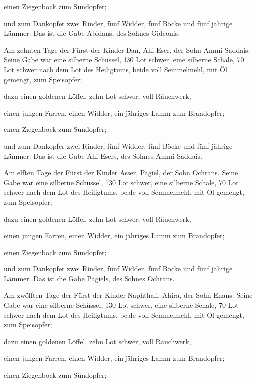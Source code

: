  einen Ziegenbock zum Sündopfer;

 und zum Dankopfer zwei Rinder, fünf Widder, fünf Böcke
und fünf jährige Lämmer. Das ist die Gabe Abidans, des Sohnes Gideonis.

 Am zehnten Tage der Fürst der Kinder Dan, Ahi-Eser, der
Sohn Ammi-Saddais.  Seine Gabe war eine silberne
Schüssel, 130 Lot schwer, eine silberne Schale, 70 Lot schwer nach dem
Lot des Heiligtums, beide voll Semmelmehl, mit Öl gemengt, zum
Speisopfer;

 dazu einen goldenen Löffel, zehn Lot schwer, voll
Räuchwerk,

 einen jungen Farren, einen Widder, ein jähriges Lamm zum
Brandopfer;

 einen Ziegenbock zum Sündopfer;

 und zum Dankopfer zwei Rinder, fünf Widder, fünf Böcke
und fünf jährige Lämmer. Das ist die Gabe Ahi-Esers, des Sohnes
Ammi-Saddais.

 Am elften Tage der Fürst der Kinder Asser, Pagiel, der
Sohn Ochrans.  Seine Gabe war eine silberne Schüssel, 130
Lot schwer, eine silberne Schale, 70 Lot schwer nach dem Lot des
Heiligtums, beide voll Semmelmehl, mit Öl gemengt, zum Speisopfer;

 dazu einen goldenen Löffel, zehn Lot schwer, voll
Räuchwerk,

 einen jungen Farren, einen Widder, ein jähriges Lamm zum
Brandopfer;

 einen Ziegenbock zum Sündopfer;

 und zum Dankopfer zwei Rinder, fünf Widder, fünf Böcke
und fünf jährige Lämmer. Das ist die Gabe Pagiels, des Sohnes Ochrans.

 Am zwölften Tage der Fürst der Kinder Naphthali, Ahira,
der Sohn Enans.  Seine Gabe war eine silberne Schüssel,
130 Lot schwer, eine silberne Schale, 70 Lot schwer nach dem Lot des
Heiligtums, beide voll Semmelmehl, mit Öl gemengt, zum Speisopfer;

 dazu einen goldenen Löffel, zehn Lot schwer, voll
Räuchwerk,

 einen jungen Farren, einen Widder, ein jähriges Lamm zum
Brandopfer;

 einen Ziegenbock zum Sündopfer;

